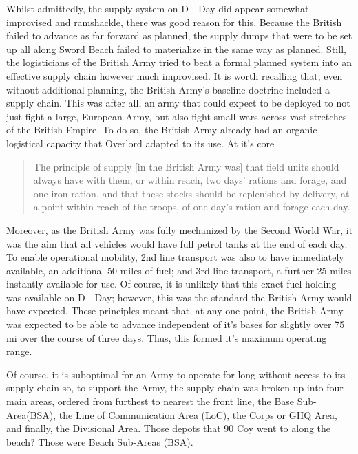 \documentclass[noraggedright]{turabian-researchpaper}
\newcommand{\Petrol}{Precis of Lecture No. 12:  Petrol}
\begin{document}
Whilst admittedly, the supply system on D - Day did appear somewhat improvised
and ramshackle, there was good reason for this.  Because the British failed to
advance as far forward as planned, the supply dumps that were to be set up all
along Sword Beach failed to materialize in the same way as planned.  Still,
the logisticians of the British Army tried to beat a formal planned system
into an effective supply chain however much improvised.  It is worth recalling
that, even without additional planning, the British Army's baseline doctrine 
included a supply chain.  This was after all, an army that could expect to be
deployed to not just fight a large, European Army, but also fight small wars
across vast stretches of the British Empire.  To do so, the British Army already
had an organic logistical capacity that Overlord adapted to its use.  
At it's core

\begin{quotation}
	 The principle of supply [in the British Army was] that field units 
	should always have
	 with them, or within reach, two days' rations and forage, and one 
	 iron ration, and that these stocks should be replenished by 
	 delivery, at a point within reach of the troops, of one day's ration
	 and forage each day. %
	
\end{quotation}

Moreover, as the British Army was fully mechanized by the Second World War,
it was the aim that all vehicles would have full petrol tanks at the end of
each day. To enable operational mobility, 2nd line transport was also to have 
immediately available, an additional 50 miles of fuel; and 3rd line transport,
a further 25 miles instantly available for use.\autocite[\Petrol][s 3]
{27course}
Of course, it is unlikely that this exact fuel holding was available on 
D - Day;
however, this was the standard the British Army would have expected.  These
principles meant that, at any one point, the British Army was expected to be
able to advance independent of it's bases for slightly over 75 mi over the 
course of three days.  Thus, this formed it's maximum operating range.

Of course, it is suboptimal for an Army to operate for long without access to
its supply chain so, to support the Army, the supply chain was broken up into 
four main areas, ordered from furthest to nearest the front line, 
the Base Sub-Area(BSA), the Line of Communication Area (LoC), the Corps or 
GHQ Area, and finally, the Divisional Area.  Those depots that 90 Coy went to
along the beach?  Those were Beach Sub-Areas (BSA).  
\end{document}
